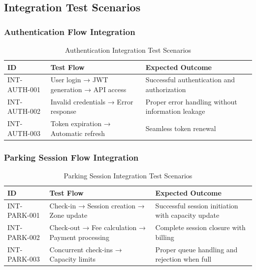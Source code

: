 \subsection{Integration Test Scenarios}

\subsubsection{Authentication Flow Integration}
\begin{table}[H]
\centering
\small
\renewcommand{\arraystretch}{1.3}
\begin{tabularx}{\textwidth}{|l|>{\RaggedRight\arraybackslash}X|>{\RaggedRight\arraybackslash}X|}
\hline
\textbf{ID} & \textbf{Test Flow} & \textbf{Expected Outcome} \\
\hline
INT-AUTH-001 & User login → JWT generation → API access & Successful authentication and authorization \\
\hline
INT-AUTH-002 & Invalid credentials → Error response & Proper error handling without information leakage \\
\hline
INT-AUTH-003 & Token expiration → Automatic refresh & Seamless token renewal \\
\hline
\end{tabularx}
\caption{Authentication Integration Test Scenarios}
\label{tab:auth-integration-tests}
\end{table}

\subsubsection{Parking Session Flow Integration}
\begin{table}[H]
\centering
\small
\renewcommand{\arraystretch}{1.3}
\begin{tabularx}{\textwidth}{|l|>{\RaggedRight\arraybackslash}X|>{\RaggedRight\arraybackslash}X|}
\hline
\textbf{ID} & \textbf{Test Flow} & \textbf{Expected Outcome} \\
\hline
INT-PARK-001 & Check-in → Session creation → Zone update & Successful session initiation with capacity update \\
\hline
INT-PARK-002 & Check-out → Fee calculation → Payment processing & Complete session closure with billing \\
\hline
INT-PARK-003 & Concurrent check-ins → Capacity limits & Proper queue handling and rejection when full \\
\hline
\end{tabularx}
\caption{Parking Session Integration Test Scenarios}
\label{tab:parking-integration-tests}
\end{table}

